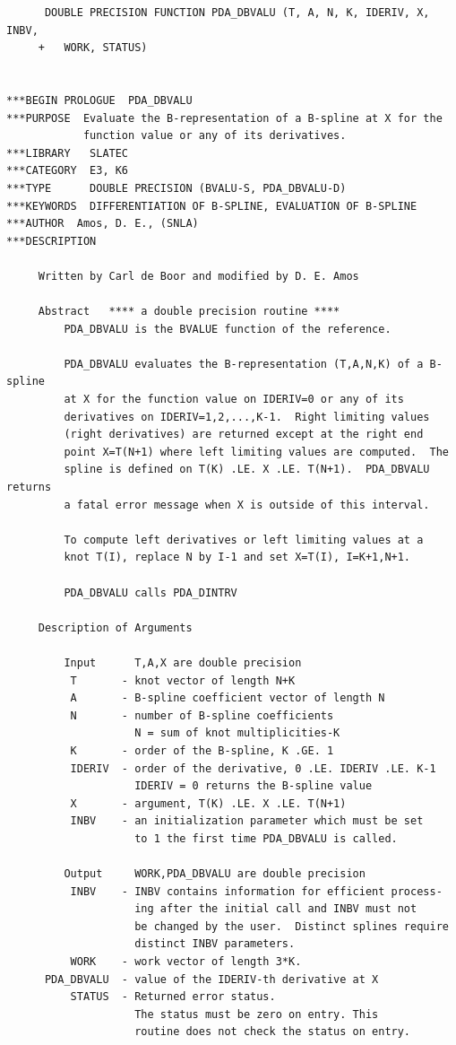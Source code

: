 \documentclass[11pt,twoside]{article}
\begin{document}
\begin{verbatim}
      DOUBLE PRECISION FUNCTION PDA_DBVALU (T, A, N, K, IDERIV, X, INBV,
     +   WORK, STATUS)


***BEGIN PROLOGUE  PDA_DBVALU
***PURPOSE  Evaluate the B-representation of a B-spline at X for the
            function value or any of its derivatives.
***LIBRARY   SLATEC
***CATEGORY  E3, K6
***TYPE      DOUBLE PRECISION (BVALU-S, PDA_DBVALU-D)
***KEYWORDS  DIFFERENTIATION OF B-SPLINE, EVALUATION OF B-SPLINE
***AUTHOR  Amos, D. E., (SNLA)
***DESCRIPTION

     Written by Carl de Boor and modified by D. E. Amos

     Abstract   **** a double precision routine ****
         PDA_DBVALU is the BVALUE function of the reference.

         PDA_DBVALU evaluates the B-representation (T,A,N,K) of a B-spline
         at X for the function value on IDERIV=0 or any of its
         derivatives on IDERIV=1,2,...,K-1.  Right limiting values
         (right derivatives) are returned except at the right end
         point X=T(N+1) where left limiting values are computed.  The
         spline is defined on T(K) .LE. X .LE. T(N+1).  PDA_DBVALU returns
         a fatal error message when X is outside of this interval.

         To compute left derivatives or left limiting values at a
         knot T(I), replace N by I-1 and set X=T(I), I=K+1,N+1.

         PDA_DBVALU calls PDA_DINTRV

     Description of Arguments

         Input      T,A,X are double precision
          T       - knot vector of length N+K
          A       - B-spline coefficient vector of length N
          N       - number of B-spline coefficients
                    N = sum of knot multiplicities-K
          K       - order of the B-spline, K .GE. 1
          IDERIV  - order of the derivative, 0 .LE. IDERIV .LE. K-1
                    IDERIV = 0 returns the B-spline value
          X       - argument, T(K) .LE. X .LE. T(N+1)
          INBV    - an initialization parameter which must be set
                    to 1 the first time PDA_DBVALU is called.

         Output     WORK,PDA_DBVALU are double precision
          INBV    - INBV contains information for efficient process-
                    ing after the initial call and INBV must not
                    be changed by the user.  Distinct splines require
                    distinct INBV parameters.
          WORK    - work vector of length 3*K.
      PDA_DBVALU  - value of the IDERIV-th derivative at X
          STATUS  - Returned error status.
                    The status must be zero on entry. This
                    routine does not check the status on entry.


\end{verbatim}
\end{document}

